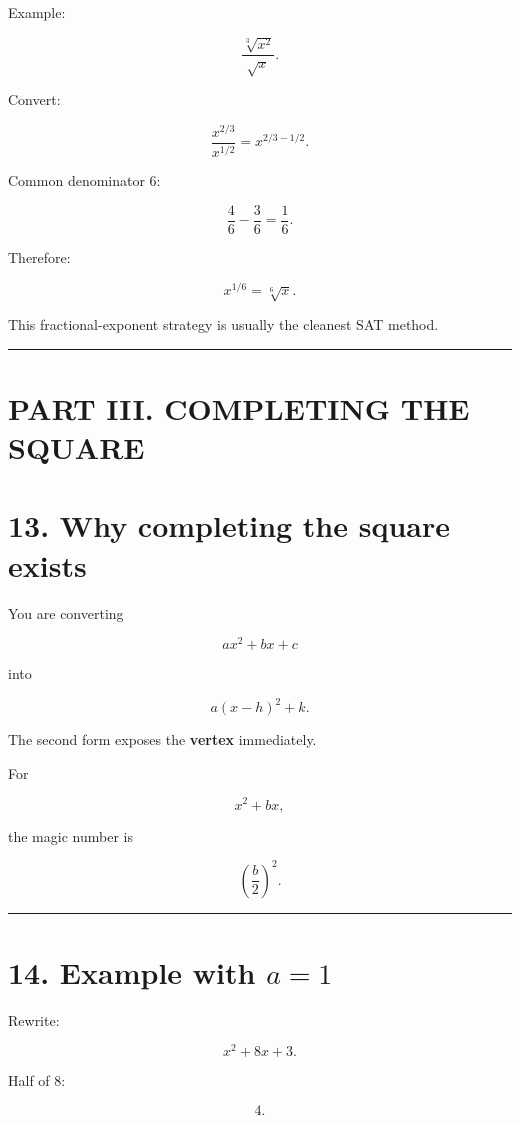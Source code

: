 \documentclass[
]{article}
\begin{document}
Example:

\[
\frac{\sqrt[3]{x^2}}{\sqrt{x}}.
\]

Convert:

\[
\frac{x^{2/3}}{x^{1/2}}
=
x^{2/3-1/2}.
\]

Common denominator \(6\):

\[
\frac46-\frac36=\frac16.
\]

Therefore:

\[
\boxed{x^{1/6}}
=
\boxed{\sqrt[6]x}.
\]

This fractional-exponent strategy is usually the cleanest SAT method.

\begin{center}\rule{0.5\linewidth}{0.5pt}\end{center}

\section{PART III. COMPLETING THE
SQUARE}\label{part-iii.-completing-the-square}

\section{13. Why completing the square
exists}\label{why-completing-the-square-exists}

You are converting

\[
ax^2+bx+c
\]

into

\[
a(x-h)^2+k.
\]

The second form exposes the \textbf{vertex} immediately.

For

\[
x^2+bx,
\]

the magic number is

\[
\left(\frac b2\right)^2.
\]

\begin{center}\rule{0.5\linewidth}{0.5pt}\end{center}

\section{\texorpdfstring{14. Example with
\(a=1\)}{14. Example with a=1}}\label{example-with-a1}

Rewrite:

\[
x^2+8x+3.
\]

Half of \(8\):

\[
4.
\]
\end{document}
